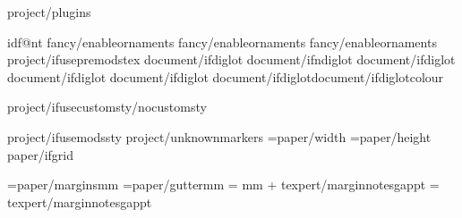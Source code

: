 {project/plugins}
\def\pluginlist{{{plugins_}}}


\def\zautoBookEndDecoration{{}}
\def\zBookEndDecoration{{}}
\def\BookEndDecorationSkip{{16pt}}
\csname idf@nt\endcsname %
{fancy/enableornaments}
{fancy/enableornaments}
{fancy/enableornaments}
{project/ifusepremodstex}
\PiclistLitPcttrue
{document/ifdiglot}\diglottrue
{document/ifndiglot}\diglotfalse
{document/ifdiglot}\diglotcolumns
{document/ifdiglot}
{document/ifdiglot}
{document/ifdiglot}{document/ifdiglotcolour}


{project/ifusecustomsty}{/nocustomsty}


{project/ifusemodssty} %
{project/unknownmarkers}
\PaperWidth={paper/width}
\PaperHeight={paper/height}
{paper/ifgrid}\def\doLines{{{paper/notelines}}}
\def\NoteLineColMajor{{{majornlcolor_}}} %

\MarginUnit={paper/margins}mm
\def\TopMarginFactor{{{paper/topmarginfactor}}}
\def\BottomMarginFactor{{{paper/bottommarginfactor}}}
\def\SideMarginFactor{{1.0}}
\BindingGutter={paper/gutter}mm
\def\DefaultSpaceBeside{{{texpert/cutouterpadding} pt}}
\marginnoteswidth = mm + {texpert/marginnotesgap}pt \relax
\marginnotesgap = {texpert/marginnotesgap}pt
\def\MarginNoteSide{{{paper/marginnotespos}}}


